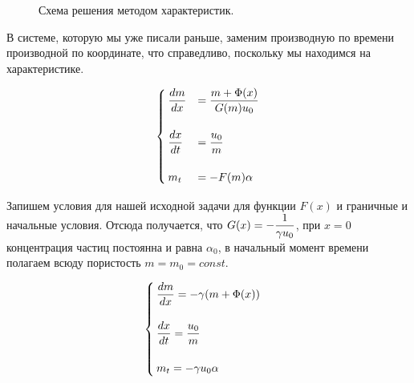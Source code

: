 \begin{figure}[h!]
\caption{Схема решения методом характеристик.}
\label{fig:image1}
\end{figure}

\par В системе, которую мы уже писали раньше, заменим производную по времени производной по координате, что справедливо, поскольку мы находимся на характеристике.

\begin{equation*}
\begin{cases}

\displaystyle \frac{dm}{dx} &= \displaystyle \frac{m+\Phi(x)}{G(m)u_{0}}\\
&\\
\displaystyle \frac{dx}{dt}&= \displaystyle \frac{u_{0}}{m}\\
&\\
m_{t} &= -F(m)\alpha\\

\end{cases}
\end{equation*}

\par Запишем условия для нашей исходной задачи для функции $F(x)$ и граничные и начальные условия. Отсюда получается, что $\displaystyle G(x)=-\frac{1}{\gamma u_{0}}$, при $x=0$ концентрация частиц постоянна и равна $\alpha_{0}$, в начальный момент времени полагаем всюду пористость $m=m_{0} = const$.

\begin{equation*}
\begin{cases}

\displaystyle \frac{dm}{dx} = \displaystyle -\gamma (m+\Phi(x))\\
{}\\
\displaystyle \frac{dx}{dt}= \displaystyle \frac{u_{0}}{m}\\
{}\\
m_{t} = -\gamma u_{0}\alpha\\

\end{cases}
\end{equation*}

